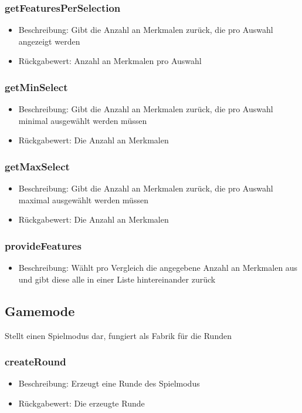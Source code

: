 \documentclass[a4paper]{scrreprt}
\begin{document}
	\subsubsection{getFeaturesPerSelection}
	\begin{itemize}
		\item Beschreibung: Gibt die Anzahl an Merkmalen zurück, die pro Auswahl angezeigt werden
		\item Rückgabewert: Anzahl an Merkmalen pro Auswahl
	\end{itemize}
	\subsubsection{getMinSelect}
	\begin{itemize}
		\item Beschreibung: Gibt die Anzahl an Merkmalen zurück, die pro Auswahl minimal ausgewählt werden müssen
		\item Rückgabewert: Die Anzahl an Merkmalen
	\end{itemize}
	\subsubsection{getMaxSelect}
	\begin{itemize}
		\item Beschreibung: Gibt die Anzahl an Merkmalen zurück, die pro Auswahl maximal ausgewählt werden müssen
		\item Rückgabewert: Die Anzahl an Merkmalen
	\end{itemize}
	\subsubsection{provideFeatures}
	\begin{itemize}
	\item Beschreibung: Wählt pro Vergleich die angegebene Anzahl an Merkmalen aus und gibt diese alle in einer Liste hintereinander zurück
	\end{itemize}

	\subsection{Gamemode}
	Stellt einen Spielmodus dar, fungiert als Fabrik für die Runden
	\subsubsection{createRound}
	\begin{itemize}
		\item Beschreibung: Erzeugt eine Runde des Spielmodus
		\item Rückgabewert: Die erzeugte Runde
	\end{itemize}
\end{document}
